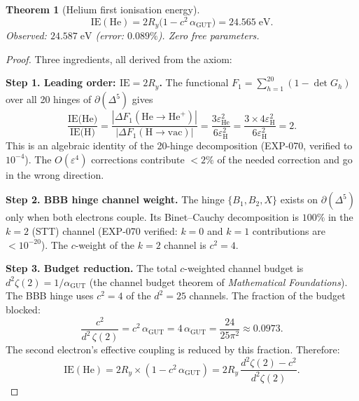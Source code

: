 \documentclass[12pt]{article}
\newtheorem{theorem}{Theorem}[section]
\theoremstyle{remark}
\theoremstyle{definition}
\begin{document}
\begin{theorem}[Helium first ionisation energy]
\label{thm:helium_IE}
\begin{equation}
\boxed{\text{IE}(\text{He}) = 2R_y\bigl(1 - c^2\,\alpha_\text{GUT}\bigr) = 24.565\;\text{eV}.}
\end{equation}
Observed: $24.587\;\text{eV}$ (error: $0.089\%$).  Zero free parameters.
\end{theorem}
\begin{proof}
Three ingredients, all derived from the axiom:

\textbf{Step 1.  Leading order: $\mathrm{IE} = 2R_y$.}
The functional $F_1 = \sum_{h=1}^{20}(1-\det G_h)$ over all 20 hinges of $\partial(\Delta^5)$ gives
\begin{equation}
\frac{\text{IE(He)}}{\text{IE(H)}} = \frac{|\Delta F_1(\text{He}\to\text{He}^+)|}{|\Delta F_1(\text{H}\to\text{vac})|}
= \frac{3\varepsilon_\text{He}^2}{6\varepsilon_\text{H}^2} = \frac{3 \times 4\varepsilon_\text{H}^2}{6\varepsilon_\text{H}^2} = 2.
\end{equation}
This is an algebraic identity of the 20-hinge decomposition (EXP-070, verified to $10^{-4}$).  The $O(\varepsilon^4)$ corrections contribute $<2\%$ of the needed correction and go in the wrong direction.

\textbf{Step 2.  BBB hinge channel weight.}
The hinge $\{B_1, B_2, X\}$ exists on $\partial(\Delta^5)$ only when both electrons couple.  Its Binet--Cauchy decomposition is $100\%$ in the $k=2$ (STT) channel (EXP-070 verified: $k=0$ and $k=1$ contributions are $< 10^{-20}$).  The $c$-weight of the $k=2$ channel is $c^2 = 4$.

\textbf{Step 3.  Budget reduction.}
The total $c$-weighted channel budget is $d^2\zeta(2) = 1/\alpha_\text{GUT}$ (the channel budget theorem of \textit{Mathematical Foundations}).
The BBB hinge uses $c^2 = 4$ of the $d^2 = 25$ channels.  The fraction of the budget blocked:
\begin{equation}
\frac{c^2}{d^2\,\zeta(2)} = c^2\,\alpha_\text{GUT} = 4\,\alpha_\text{GUT} = \frac{24}{25\pi^2} \approx 0.0973.
\end{equation}
The second electron's effective coupling is reduced by this fraction.  Therefore:
\begin{equation}
\text{IE}(\text{He}) = 2R_y \times \left(1 - c^2\,\alpha_\text{GUT}\right) = 2R_y\,\frac{d^2\zeta(2) - c^2}{d^2\zeta(2)}.
\end{equation}
\end{proof}
\end{document}
